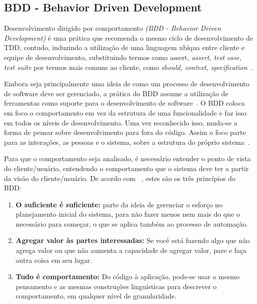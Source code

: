 \subsection{BDD - Behavior Driven Development}

Desenvolvimento dirigido por comportamento \textit{(BDD - Behavior Driven Development)} 
é uma prática que recomenda o mesmo ciclo de desenvolvimento de TDD, contudo, induzindo 
a utilização de uma linguagem ubíqua entre cliente e equipe de desenvolvimento, substituindo termos como assert, \textit{assert, test case, test suite} por termos 
mais comuns ao cliente, como \textit{should, context, specification}~\cite{bernardo2011}.

Embora seja principalmente uma ideia de como um processo de desenvolvimento de 
software deve ser gerenciado, a prática do BDD assume a utilização de ferramentas 
como suporte para o desenvolvimento de software~\cite{haring2011}. 
%
O BDD coloca em foco o comportamento em vez da estrutura de uma funcionalidade e faz isso em todos os níveis de desenvolvimento. Uma vez reconhecido isso, muda-se a forma de pensar sobre desenvolvimento para fora do código. Assim o foco parte para as interações, as pessoas e o sistema, sobre a 
estrutura do próprio sistema~\cite{chelimsky2010}.

Para que o comportamento seja analisado, é necessário entender o ponto de vista do 
cliente/usuário, entendendo o comportamento que o sistema deve ter a partir da
visão do cliente/usuário. 
%
De acordo com ~, estes são os três princípios do BDD:

\begin{enumerate}
\item \textbf{O suficiente é suficiente:} parte da ideia de gerenciar o esforço no 
planejamento inicial do sistema, para não fazer menos nem mais do que o necessário 
para começar, o que se aplica também ao processo de automação.

\item \textbf{Agregar valor às partes interessadas:} Se você está fazendo algo que 
não agrega valor ou que não aumenta a capacidade de agregar valor, pare e faça outra 
coisa em seu lugar.

\item \textbf{Tudo é comportamento:} Do código à aplicação, pode-se usar o mesmo 
pensamento e as mesmas construções linguísticas para descrever o comportamento, em 
qualquer nível de granularidade. 
\end{enumerate}

